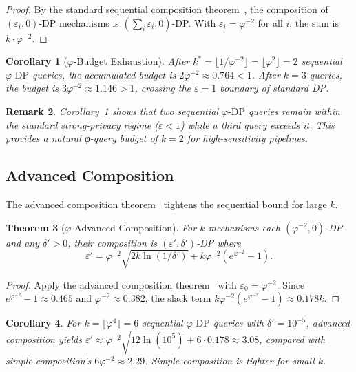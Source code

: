 \documentclass[12pt]{article}
\newtheorem{theorem}{Theorem}
\newtheorem{corollary}[theorem]{Corollary}
\newtheorem{remark}[theorem]{Remark}
\newcommand{\AMOR}{\varphi^{-2}}
\newcommand{\PHI}{\varphi}
\newcommand{\eps}{\varepsilon}
\newcommand{\phiDP}{\varphi\text{-DP}}
\begin{document}
\begin{proof}
By the standard sequential composition theorem~\cite{Dwork2006}, the composition
of $(\eps_i, 0)$-DP mechanisms is $(\sum_i \eps_i, 0)$-DP.  With $\eps_i =
\AMOR$ for all $i$, the sum is $k \cdot \AMOR$.
\end{proof}

\begin{corollary}[$\varphi$-Budget Exhaustion]
\label{cor:budget}
After $k^* = \lfloor 1/\AMOR \rfloor = \lfloor \PHI^2 \rfloor = 2$ sequential
$\phiDP$ queries, the accumulated budget is $2\AMOR \approx 0.764 < 1$.  After
$k = 3$ queries, the budget is $3\AMOR \approx 1.146 > 1$, crossing the
$\eps = 1$ boundary of standard DP.
\end{corollary}

\begin{remark}
Corollary~\ref{cor:budget} shows that two sequential $\phiDP$ queries remain
within the standard strong-privacy regime ($\eps < 1$) while a third query
exceeds it.  This provides a natural \emph{φ-query budget} of $k=2$ for
high-sensitivity pipelines.
\end{remark}

\subsection{Advanced Composition}

The advanced composition theorem~\cite{Dwork2010} tightens the sequential bound
for large $k$.

\begin{theorem}[$\varphi$-Advanced Composition]
\label{thm:adv-comp}
For $k$ mechanisms each $(\AMOR, 0)$-DP and any $\delta' > 0$, their
composition is $(\eps', \delta')$-DP where
\[
  \eps' = \AMOR\sqrt{2k\ln(1/\delta')} + k\AMOR(e^{\AMOR}-1).
\]
\end{theorem}

\begin{proof}
Apply the advanced composition theorem~\cite{Dwork2010} with $\eps_0 = \AMOR$.
Since $e^{\AMOR} - 1 \approx 0.465$ and $\AMOR \approx 0.382$, the slack term
$k\AMOR(e^{\AMOR}-1) \approx 0.178k$.
\end{proof}

\begin{corollary}
For $k = \lfloor \PHI^4 \rfloor = 6$ sequential $\phiDP$ queries with
$\delta' = 10^{-5}$, advanced composition yields
$\eps' \approx \AMOR\sqrt{12\ln(10^5)} + 6\cdot 0.178 \approx 3.08$, compared
with simple composition's $6\AMOR \approx 2.29$.  Simple composition is tighter
for small $k$.
\end{corollary}
\end{document}
